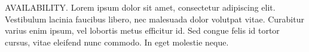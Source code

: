AVAILABILITY. Lorem ipsum dolor sit amet, consectetur adipiscing elit. Vestibulum lacinia faucibus libero, nec malesuada dolor volutpat vitae. Curabitur varius enim ipsum, vel lobortis metus efficitur id. Sed congue felis id tortor cursus, vitae eleifend nunc commodo. In eget molestie neque.
